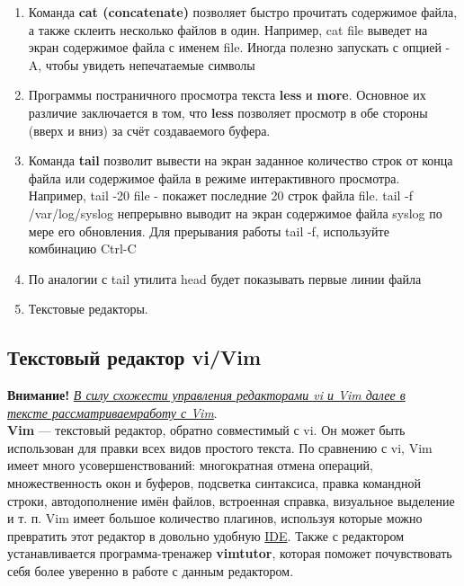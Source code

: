 \documentclass[14pt, a4paper]{article}
\begin{document}
\begin{enumerate}
    \item Команда \textbf{cat (concatenate)} позволяет быстро прочитать содержимое файла, а также склеить
    несколько файлов в один. Например, \colorbox{backcolour}{cat file} выведет на экран содержимое файла с
    именем file. Иногда полезно запускать с опцией -A, чтобы увидеть непечатаемые символы
    \item Программы постраничного просмотра текста \textbf{less} и \textbf{more}. Основное их различие заключается
    в том, что \textbf{less} позволяет просмотр в обе стороны (вверх и вниз) за счёт создаваемого буфера.
    \item  Команда \textbf{tail} позволит вывести на экран заданное количество строк от конца файла или
    содержимое файла в режиме интерактивного просмотра. Например, \colorbox{backcolour}{tail -20 file} -
    покажет последние 20 строк файла file.\colorbox{backcolour}{ tail -f /var/log/syslog} непрерывно выводит на
    экран содержимое файла syslog по мере его обновления. Для прерывания работы tail -f,
    используйте комбинацию Ctrl-C
    \item По аналогии с tail утилита head будет показывать первые линии файла
    \item Текстовые редакторы.     
\end{enumerate}

\subsection*{Текстовый редактор vi/Vim} 


\textbf{Внимание!} \underline{\textit{В силу схожести управления редакторами vi и Vim далее в}} \\
\underline{\textit{тексте рассматриваемработу с Vim}}.\\

\textbf{Vim} — текстовый редактор, обратно совместимый с vi. Он может быть использован для правки
всех видов простого текста. По сравнению с vi, Vim имеет много усовершенствований: многократная
отмена операций, множественность окон и буферов, подсветка синтаксиса, правка командной строки,
автодополнение имён файлов, встроенная справка, визуальное выделение и т. п. Vim имеет большое
количество плагинов, используя которые можно превратить этот редактор в довольно удобную \href{https://ru.wikipedia.org/wiki/Интегрированная_среда_разработки}{IDE}.
Также с редактором устанавливается программа-тренажер \textbf{vimtutor}, которая поможет почувствовать
себя более уверенно в работе с данным редактором.\\
\end{document}

